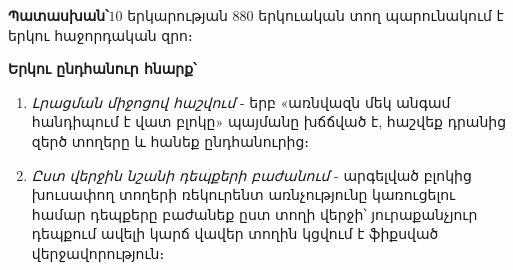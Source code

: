 \documentclass[11pt,a4paper]{article}
\newcommand{\answer}[1]{\begin{answerbox}\centering\textbf{Պատասխան՝}\quad #1\end{answerbox}}
\begin{document}
\answer{$10$ երկարության $880$ երկուական տող պարունակում է երկու հաջորդական զրո։}

\begin{methodbox}
\textbf{Երկու ընդհանուր հնարք՝}
\begin{enumerate}[leftmargin=1.5em,itemsep=1pt]
  \item \emph{Լրացման միջոցով հաշվում} - երբ «առնվազն մեկ անգամ հանդիպում է վատ բլոկը» պայմանը
        խճճված է, հաշվեք դրանից զերծ տողերը և հանեք ընդհանուրից։
  \item \emph{Ըստ վերջին նշանի դեպքերի բաժանում} - արգելված բլոկից խուսափող տողերի ռեկուրենտ
        առնչությունը կառուցելու համար դեպքերը բաժանեք ըստ տողի վերջի՝ յուրաքանչյուր դեպքում
        ավելի կարճ վավեր տողին կցվում է ֆիքսված վերջավորություն։
\end{enumerate}
\end{methodbox}
\end{document}
